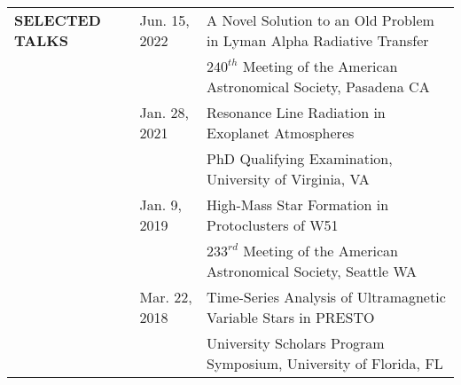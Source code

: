 \documentclass{article}
\begin{document}
\begin{tabular}{p{4cm}p{2.2cm}l}
    \large{\textbf{SELECTED \newline TALKS}}
    &Jun. 15, 2022 & A Novel Solution to an Old Problem in Lyman Alpha Radiative Transfer \vspace{-0.5cm}\\
    &              & \small $240^{th}$ Meeting of the American Astronomical Society, Pasadena CA \vspace{0.125cm} \\

    &Jan. 28, 2021 & Resonance Line Radiation in Exoplanet Atmospheres \\
    &              & \small PhD Qualifying Examination, University of Virginia, VA  \vspace{0.125cm} \\
    &Jan. 9, 2019 & High-Mass Star Formation in Protoclusters of W51 \\
    &            & \small $233^{rd}$ Meeting of the American Astronomical Society, Seattle WA  \vspace{0.125cm} \\
    &Mar. 22, 2018 & Time-Series Analysis of Ultramagnetic Variable Stars in PRESTO\\
    &              & \small University Scholars Program Symposium, University of Florida, FL  \vspace{0.125cm} 
\end{tabular}
\vspace{0.5cm}

\end{document}
